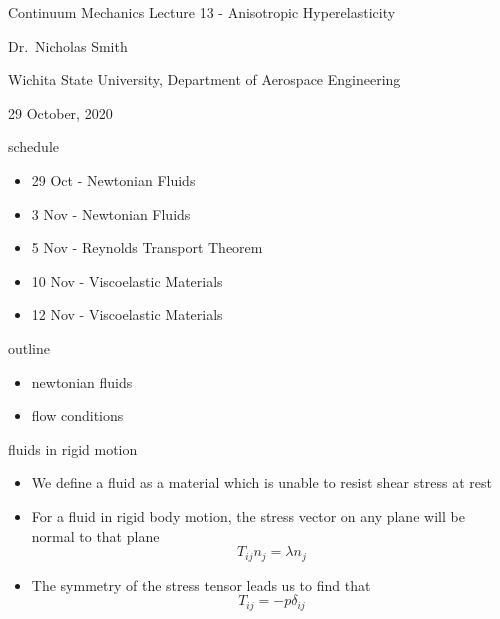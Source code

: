 \documentclass[12pt,handout]{beamer}
\providecommand{\tightlist}{%
  \setlength{\itemsep}{0pt}\setlength{\parskip}{0pt}}
\providecommand{\tightlist}{%
\setlength{\itemsep}{0pt}\setlength{\parskip}{0pt}}
\begin{document}
\begin{frame}{Continuum Mechanics}
\protect\hypertarget{continuum-mechanics}{}
Lecture 13 - Anisotropic Hyperelasticity

Dr.~Nicholas Smith

Wichita State University, Department of Aerospace Engineering

29 October, 2020
\end{frame}

\begin{frame}{schedule}
\protect\hypertarget{schedule}{}
\begin{itemize}
\tightlist
\item
  29 Oct - Newtonian Fluids
\item
  3 Nov - Newtonian Fluids
\item
  5 Nov - Reynolds Transport Theorem
\item
  10 Nov - Viscoelastic Materials
\item
  12 Nov - Viscoelastic Materials
\end{itemize}
\end{frame}

\begin{frame}{outline}
\protect\hypertarget{outline}{}
\begin{itemize}
\tightlist
\item
  newtonian fluids
\item
  flow conditions
\end{itemize}
\end{frame}

\begin{frame}{fluids in rigid motion}
\protect\hypertarget{fluids-in-rigid-motion}{}
\begin{itemize}
\item
  We define a fluid as a material which is unable to resist shear stress
  at rest
\item
  For a fluid in rigid body motion, the stress vector on any plane will
  be normal to that plane \[T_{ij}n_j = \lambda n_j\]
\item
  The symmetry of the stress tensor leads us to find that
  \[T_{ij} = -p \delta_{ij}\]
\end{itemize}
\end{frame}
\end{document}
